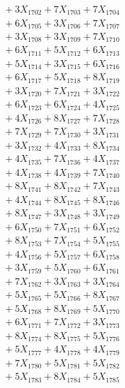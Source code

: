 \documentclass[a4paper,10pt]{article}
\begin{document}
{\begin{align}
&\;  + 3 X_{1702} + 7 X_{1703} + 7 X_{1704} \\[0.3ex]
&\;  + 6 X_{1705} + 3 X_{1706} + 7 X_{1707} \\[0.3ex]
&\;  + 3 X_{1708} + 3 X_{1709} + 7 X_{1710} \\[0.3ex]
&\;  + 6 X_{1711} + 5 X_{1712} + 6 X_{1713} \\[0.3ex]
&\;  + 5 X_{1714} + 3 X_{1715} + 6 X_{1716} \\[0.3ex]
&\;  + 6 X_{1717} + 5 X_{1718} + 8 X_{1719} \\[0.5ex]\allowbreak
&\;  + 3 X_{1720} + 7 X_{1721} + 3 X_{1722} \\[0.3ex]
&\;  + 6 X_{1723} + 6 X_{1724} + 4 X_{1725} \\[0.3ex]
&\;  + 4 X_{1726} + 8 X_{1727} + 7 X_{1728} \\[0.3ex]
&\;  + 7 X_{1729} + 7 X_{1730} + 3 X_{1731} \\[0.3ex]
&\;  + 3 X_{1732} + 4 X_{1733} + 8 X_{1734} \\[0.3ex]
&\;  + 4 X_{1735} + 7 X_{1736} + 4 X_{1737} \\[0.3ex]
&\;  + 4 X_{1738} + 4 X_{1739} + 7 X_{1740} \\[0.3ex]
&\;  + 8 X_{1741} + 8 X_{1742} + 7 X_{1743} \\[0.3ex]
&\;  + 4 X_{1744} + 8 X_{1745} + 8 X_{1746} \\[0.3ex]
&\;  + 8 X_{1747} + 3 X_{1748} + 3 X_{1749} \\[0.5ex]\allowbreak
&\;  + 6 X_{1750} + 7 X_{1751} + 6 X_{1752} \\[0.3ex]
&\;  + 8 X_{1753} + 7 X_{1754} + 5 X_{1755} \\[0.3ex]
&\;  + 4 X_{1756} + 5 X_{1757} + 6 X_{1758} \\[0.3ex]
&\;  + 3 X_{1759} + 5 X_{1760} + 6 X_{1761} \\[0.3ex]
&\;  + 7 X_{1762} + 3 X_{1763} + 3 X_{1764} \\[0.3ex]
&\;  + 5 X_{1765} + 5 X_{1766} + 8 X_{1767} \\[0.3ex]
&\;  + 5 X_{1768} + 8 X_{1769} + 5 X_{1770} \\[0.3ex]
&\;  + 6 X_{1771} + 7 X_{1772} + 3 X_{1773} \\[0.3ex]
&\;  + 8 X_{1774} + 8 X_{1775} + 5 X_{1776} \\[0.3ex]
&\;  + 5 X_{1777} + 4 X_{1778} + 4 X_{1779} \\[0.5ex]\allowbreak
&\;  + 7 X_{1780} + 5 X_{1781} + 5 X_{1782} \\[0.3ex]
&\;  + 5 X_{1783} + 8 X_{1784} + 5 X_{1785} \\[0.3ex]

\end{align}}
\end{document}
